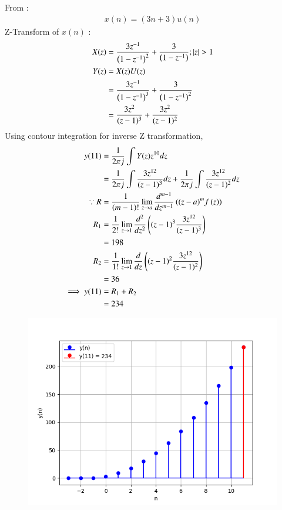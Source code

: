 \documentclass[journal,12pt,twocolumn]{IEEEtran}
\theoremstyle{remark}
\begin{document}
From :
\begin{align}
    x(n) = (3n+3)u(n)
\end{align}
Z-Transform of $x(n)$ : 
\begin{align}
    X(z) &= \frac{3z^{-1}}{\left(1-z^{-1}\right)^2} + \frac{3}{\left(1-z^{-1}\right)} ;|z| > 1\\
 Y(z) &= X(z)U(z)\\
  &= \frac{3z^{-1}}{\left(1-z^{-1}\right)^3} + \frac{3}{\left(1-z^{-1}\right)^2}\\
    &= \frac{3z^{2}}{(z-1)^3} + \frac{3z^2}{(z - 1)^2}
    \end{align}
Using contour integration for inverse Z transformation,
\begin{align}
  y(11) &= \frac{1}{2\pi j}\int Y(z) z^{10} dz \\
         &= \frac{1}{2\pi j}\int \frac{3z^{12}}{(z-1)^{3}} dz + \frac{1}{2\pi j}\int \frac{3z^{12}}{(z-1)^{2}} dz\\
        \because R&=\frac{1}{\left(m-1\right)!}\lim\limits_{z\to a}\frac{d^{m-1}}{dz^{m-1}}\left({(z-a)}^{m}f\left(z\right)\right)\\
        R_1 &=\frac{1}{2!}\lim\limits_{z\to 1}\frac{d^2}{dz^2}\left((z-1)^3\frac{3z^{12}}{(z-1)^{3}}\right)\\
        &= 198\\
        R_2 &=\frac{1}{1!}\lim\limits_{z\to 1}\frac{d}{dz}\left((z-1)^2\frac{3z^{12}}{(z-1)^{2}}\right)\\
        &= 36\\
        \implies y(11) &= R_1 + R_2 \\
        &= 234   
\end{align}

\begin{figure}[htbp]
    \centering
    \includegraphics[width = \columnwidth]{figs/y(n)plot.png}
  \caption{}
    \label{fig:graph1}
\end{figure}

% 
\end{document}
